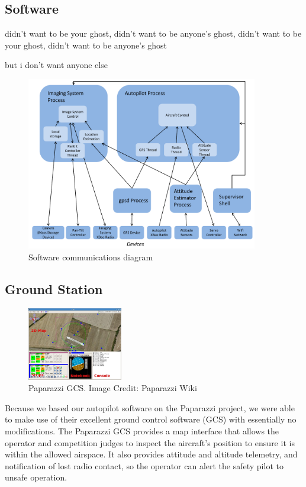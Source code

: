\documentclass[pdftex,10pt,letter]{article}
\begin{document}
\subsection{Software}
\label{sec:autopilot_software}
didn't want to be your ghost, didn't want to be anyone's ghost, didn't want to be your ghost, didn't want to be anyone's ghost

but i don't want anyone else
\begin{figure}
	\centering
	\includegraphics[width=0.9\textwidth]{../images/software_comm_diagram.pdf}
	\caption{Software communications diagram}	
	\label{fig:software_comm_diagram}
\end{figure}

\subsection{Ground Station}

\begin{figure}
	\includegraphics[width=0.37\textwidth]{../images/paparazzi_gcs.jpg}
	\caption{Paparazzi GCS. Image Credit: Paparazzi Wiki \cite{paparazziweb }}
	\label{fig:paparazzi_gcs}
\end{figure}
Because we based our autopilot software on the Paparazzi project, we were able to make use of their excellent ground control software (GCS) with essentially no modifications. The Paparazzi GCS provides a map interface that allows the operator and competition judges to inspect the aircraft's position to ensure it is within the allowed airspace. It also provides attitude and altitude telemetry, and notification of lost radio contact, so the operator can alert the safety pilot to unsafe operation.
\end{document}
